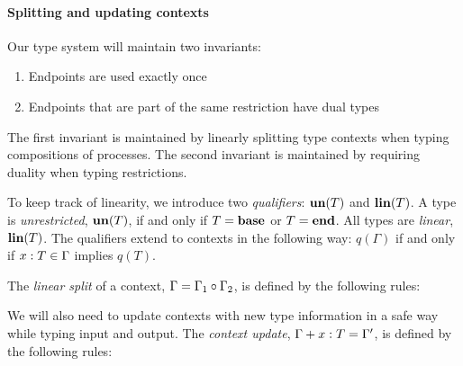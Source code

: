 \paragraph{Splitting and updating contexts}
Our type system will maintain two invariants:
\begin{enumerate}
\item Endpoints are used exactly once
\item Endpoints that are part of the same restriction have dual types
\end{enumerate}
The first invariant is maintained by linearly splitting type contexts when typing compositions of processes.
The second invariant is maintained by requiring duality when typing restrictions.

To keep track of linearity, we introduce two \emph{qualifiers}: \( \mathbf{un}(T) \) and \( \mathbf{lin}(T) \).
A type is \emph{unrestricted}, \( \mathbf{un}(T) \), if and only if \( T = \mathbf{base} \) or \( T = \mathbf{end} \).
All types are \emph{linear}, \( \mathbf{lin}(T) \).
The qualifiers extend to contexts in the following way: \( q(\Gamma) \) if and only if \( x : T \in \Gamma \) implies \( q(T) \).

The \emph{linear split} of a context, \( \Gamma = \Gamma_1 \circ \Gamma_2 \), is defined by the following rules:

We will also need to update contexts with new type information in a safe way while typing input and output.
The \emph{context update}, \( \Gamma + x : T = \Gamma' \), is defined by the following rules:

